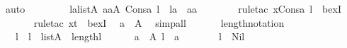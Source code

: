 \begin{isabellebody}
\ auto\ \isanewline
\ \ \ \ \isamarkupfalse%
\ \isamarkupfalse%
\ {\isachardoublequoteopen}{\isasymexists}l{\isacharprime}{\kern0pt}a{\isasymin}list{\isacharparenleft}{\kern0pt}A{\isacharparenright}{\kern0pt}{\isachardot}{\kern0pt}\ {\isasymexists}aa{\isasymin}A{\isachardot}{\kern0pt}\ Cons{\isacharparenleft}{\kern0pt}a{\isacharcomma}{\kern0pt}\ l{\isacharprime}{\kern0pt}{\isacharparenright}{\kern0pt}\ {\isacharequal}{\kern0pt}\ l{\isacharprime}{\kern0pt}a\ {\isacharat}{\kern0pt}\ {\isacharbrackleft}{\kern0pt}aa{\isacharbrackright}{\kern0pt}{\isachardoublequoteclose}\ \isanewline
\ \ \ \ \ \ \isamarkupfalse%
{\isacharparenleft}{\kern0pt}rule{\isacharunderscore}{\kern0pt}tac\ x{\isacharequal}{\kern0pt}{\isachardoublequoteopen}Cons{\isacharparenleft}{\kern0pt}a{\isacharcomma}{\kern0pt}\ l{\isacharprime}{\kern0pt}{\isacharprime}{\kern0pt}{\isacharparenright}{\kern0pt}{\isachardoublequoteclose}\ \ bexI{\isacharparenright}{\kern0pt}\ \isanewline
\ \ \ \ \ \ \isamarkupfalse%
{\isacharparenleft}{\kern0pt}rule{\isacharunderscore}{\kern0pt}tac\ x{\isacharequal}{\kern0pt}t\ \ bexI{\isacharparenright}{\kern0pt}\ \isamarkupfalse%
\ {\isacartoucheopen}a\ {\isasymin}\ A{\isacartoucheclose}\ \isamarkupfalse%
\ simp{\isacharunderscore}{\kern0pt}all\ \isamarkupfalse%
\ \isanewline
\ \ \isamarkupfalse%
\isanewline
{}\isamarkupfalse%
%
\endisatagproof
{\isafoldproof}%
%
\isadelimproof
\isanewline
%
\endisadelimproof
\isanewline
{}\isamarkupfalse%
\ length{}{\isacharunderscore}{\kern0pt}notation\ {\isacharcolon}{\kern0pt}\ \isanewline
\ \ \ l\ \ {\isachardoublequoteopen}l\ {\isasymin}\ list{\isacharparenleft}{\kern0pt}A{\isacharparenright}{\kern0pt}{\isachardoublequoteclose}\ \ {\isachardoublequoteopen}length{\isacharparenleft}{\kern0pt}l{\isacharparenright}{\kern0pt}\ {\isacharequal}{\kern0pt}\ {}{\isachardoublequoteclose}\ \isanewline
\ \ \ {\isachardoublequoteopen}{\isasymexists}a\ {\isasymin}\ A{\isachardot}{\kern0pt}\ l\ {\isacharequal}{\kern0pt}\ {\isacharbrackleft}{\kern0pt}a{\isacharbrackright}{\kern0pt}{\isachardoublequoteclose}\ \isanewline
%
\isadelimproof
%
\endisadelimproof
%
\isatagproof
{}\isamarkupfalse%
\ {\isacharminus}{\kern0pt}\ \isanewline
\ \ \isamarkupfalse%
\ {\isachardoublequoteopen}l\ {\isasymnoteq}\ Nil{\isachardoublequoteclose}\ \isamarkupfalse%

\end{isabellebody}
